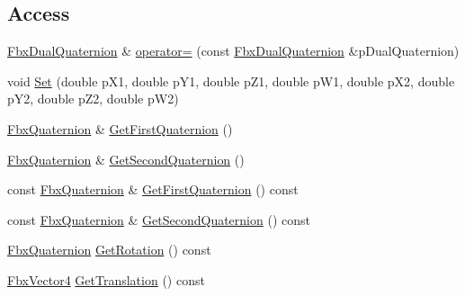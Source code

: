 \subsection*{Access}
\begin{DoxyCompactItemize}
\item 
\hyperlink{class_fbx_dual_quaternion}{Fbx\+Dual\+Quaternion} \& \hyperlink{class_fbx_dual_quaternion_ad647f8f27c587a4cd254fc87c821bd49}{operator=} (const \hyperlink{class_fbx_dual_quaternion}{Fbx\+Dual\+Quaternion} \&p\+Dual\+Quaternion)
\item 
void \hyperlink{class_fbx_dual_quaternion_a660f19c5f442716489a29e842ea85d19}{Set} (double p\+X1, double p\+Y1, double p\+Z1, double p\+W1, double p\+X2, double p\+Y2, double p\+Z2, double p\+W2)
\item 
\hyperlink{class_fbx_quaternion}{Fbx\+Quaternion} \& \hyperlink{class_fbx_dual_quaternion_aeec210c98cc1a64b097e4e9374a87e51}{Get\+First\+Quaternion} ()
\item 
\hyperlink{class_fbx_quaternion}{Fbx\+Quaternion} \& \hyperlink{class_fbx_dual_quaternion_a23cf0592cadd1679222d884cb94719d7}{Get\+Second\+Quaternion} ()
\item 
const \hyperlink{class_fbx_quaternion}{Fbx\+Quaternion} \& \hyperlink{class_fbx_dual_quaternion_a31eb96dba8793d778d486fb73534bfa1}{Get\+First\+Quaternion} () const
\item 
const \hyperlink{class_fbx_quaternion}{Fbx\+Quaternion} \& \hyperlink{class_fbx_dual_quaternion_ae19fde6e0e620ba28caf66f0ebf43965}{Get\+Second\+Quaternion} () const
\item 
\hyperlink{class_fbx_quaternion}{Fbx\+Quaternion} \hyperlink{class_fbx_dual_quaternion_a87dd60a786ce592ff03b1b9382548d41}{Get\+Rotation} () const
\item 
\hyperlink{class_fbx_vector4}{Fbx\+Vector4} \hyperlink{class_fbx_dual_quaternion_aba8ddeb900c37ca3a7de1b92b7f8312c}{Get\+Translation} () const
\end{DoxyCompactItemize}
